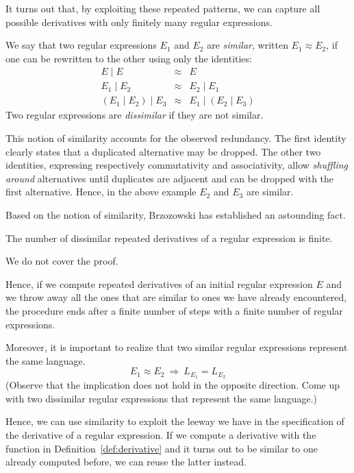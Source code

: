 It turns out that, by exploiting these repeated patterns, we can capture all
possible derivatives with only finitely many regular expressions.
\begin{definition}
We say that two regular expressions $E_1$ and $E_2$ are \emph{similar}, written
$E_1 \approx E_2$, if one can be rewritten to the other using only the identities:
\begin{eqnarray*}
E \mid E & \approx & E \\
E_1 \mid E_2 & \approx & E_2 \mid E_1 \\
(E_1 \mid E_2) \mid E_3 & \approx & E_1 \mid (E_2 \mid E_3)
\end{eqnarray*}
Two regular expressions are \emph{dissimilar} if they are not similar.
\end{definition}
This notion of similarity accounts for the observed redundancy. The first
identity clearly states that a duplicated alternative may be dropped. 
The other two identities, expressing respectively commutativity and associativity,
allow \emph{shuffling around} alternatives until duplicates are adjacent and
can be dropped with the first alternative.
Hence, in the above example $E_2$ and $E_3$ are similar.

Based on the notion of similarity, Brzozowski has established an astounding fact.
\begin{theorem}
The number of dissimilar repeated derivatives of a regular expression is finite.
\end{theorem} 
We do not cover the proof.

Hence, if we compute repeated derivatives of an initial regular expression $E$
and we throw away all the ones that are similar to ones we have already
encountered, the procedure ends after a finite number of steps with a finite
number of regular expressions.

Moreover, it is important to realize that two similar regular expressions
represent the same language.
\begin{equation*}
E_1 \approx E_2 ~\Rightarrow~ L_{E_1} = L_{E_2} 
\end{equation*}
(Observe that the implication does not hold in the opposite direction. Come up
with two dissimilar regular expressions that represent the same language.)

Hence, we can use similarity to exploit the leeway we have in the specification
of the derivative of a regular expression. If we compute a derivative with
the function in Definition~\ref{def:derivative} and it turns out to be similar
to one already computed before, we can reuse the latter instead.


